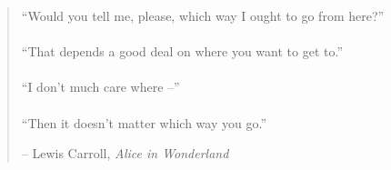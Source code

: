 
\newpage \vspace*{4cm}
\thispagestyle{empty}
\begin{quotation}
\begin{center}
  \large
  \enquote{Would you tell me, please, which way I ought to go from here?} \\~\\
  \enquote{That depends a good deal on where you want to get to.} \\~\\
  \enquote{I don't much care where --} \\~\\
  \enquote{Then it doesn't matter which way you go.}
\end{center}
\begin{flushright} -- Lewis Carroll, \textit{Alice in Wonderland}\end{flushright}
\end{quotation}
